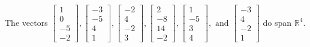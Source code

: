 \begin{exercise}
\begin{exerciseStatement}
  \end{exerciseStatement}
  \begin{exerciseAnswer}
   The vectors \(\left[\begin{array}{r}
1 \\
0 \\
-5 \\
-2
\end{array}\right] , \left[\begin{array}{r}
-3 \\
-5 \\
4 \\
1
\end{array}\right] , \left[\begin{array}{r}
-2 \\
4 \\
-2 \\
3
\end{array}\right] , \left[\begin{array}{r}
2 \\
-8 \\
14 \\
-2
\end{array}\right] , \left[\begin{array}{r}
1 \\
-5 \\
3 \\
4
\end{array}\right] , \text{ and } \left[\begin{array}{r}
-3 \\
4 \\
-2 \\
1
\end{array}\right]\) 
  	 do  
	span \(\mathbb{R}^4\).
  


  \end{exerciseAnswer}
\end{exercise}